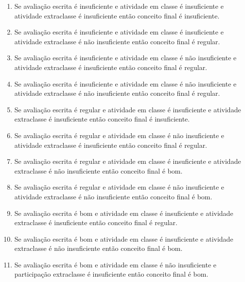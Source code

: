 \documentclass{article}
\begin{document}
\begin{enumerate}
	\item Se avaliação escrita é insuficiente e atividade em
		classe é insuficiente e atividade extraclasse é
		insuficiente então conceito final é insuficiente.

	\item Se avaliação escrita é insuficiente e atividade em
		classe é insuficiente e atividade extraclasse é não
		insuficiente então conceito final é regular.

	\item Se avaliação escrita é insuficiente e atividade em
		classe é não insuficiente e atividade extraclasse é
		insuficiente então conceito final é regular.

	\item  Se avaliação escrita é insuficiente e atividade em
		classe é não insuficiente e atividade extraclasse é não
		insuficiente então conceito final é regular.

	\item Se avaliação escrita é regular e atividade em classe
		é insuficiente e atividade extraclasse é insuficiente
		então conceito final é insuficiente.

	\item Se avaliação escrita é regular e atividade em classe
		é não insuficiente e atividade extraclasse é
		insuficiente então conceito final é regular.

	\item  Se avaliação escrita é regular e atividade em classe
		é insuficiente e atividade extraclasse é não
		insuficiente então conceito final é bom.

	\item  Se avaliação escrita é regular e atividade em classe
		é não insuficiente e atividade extraclasse é não
		insuficiente então conceito final é bom.

	\item  Se avaliação escrita é bom e atividade em classe é
		insuficiente e atividade extraclasse é insuficiente
		então conceito final é regular.

	\item Se avaliação escrita é bom e atividade em classe é
		insuficiente e atividade extraclasse é não insuficiente
		então conceito final é bom.

	\item Se avaliação escrita é bom e atividade em classe é não
		insuficiente e participação extraclasse é insuficiente
		então conceito final é bom.


\end{enumerate}
\end{document}
